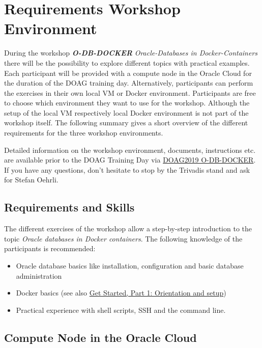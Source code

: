 \hypertarget{requirements-workshop-environment}{%
\section{Requirements Workshop
Environment}\label{requirements-workshop-environment}}

During the workshop \textbf{\emph{O-DB-DOCKER}} \emph{Oracle-Databases
in Docker-Containers} there will be the possibility to explore different
topics with practical examples. Each participant will be provided with a
compute node in the Oracle Cloud for the duration of the DOAG training
day. Alternatively, participants can perform the exercises in their own
local VM or Docker environment. Participants are free to choose which
environment they want to use for the workshop. Although the setup of the
local VM respectively local Docker environment is not part of the
workshop itself. The following summary gives a short overview of the
different requirements for the three workshop environments.

Detailed information on the workshop environment, documents,
instructions etc. are available prior to the DOAG Training Day via
\href{https://url.oradba.ch/DOAG2019_O-DB-DOCKER}{DOAG2019 O-DB-DOCKER}.
If you have any questions, don't hesitate to stop by the Trivadis stand
and ask for Stefan Oehrli.

\hypertarget{requirements-and-skills}{%
\subsection{Requirements and Skills}\label{requirements-and-skills}}

The different exercises of the workshop allow a step-by-step
introduction to the topic \emph{Oracle databases in Docker containers}.
The following knowledge of the participants is recommended:

\begin{itemize}
\tightlist
\item
  Oracle database basics like installation, configuration and basic
  database administration
\item
  Docker basics (see also
  \href{https://docs.docker.com/get-started/}{Get Started, Part 1:
  Orientation and setup})
\item
  Practical experience with shell scripts, SSH and the command line.
\end{itemize}

\hypertarget{compute-node-in-the-oracle-cloud}{%
\subsection{Compute Node in the Oracle
Cloud}\label{compute-node-in-the-oracle-cloud}}

